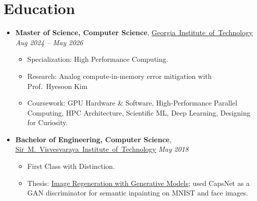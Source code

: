 \documentclass[letterpaper, 11pt]{article}
\let\oldhref\href
\renewcommand{\href}[2]{\oldhref{#1}{\uline{#2}}}
\newcommand{\resumeEntry}[3]{\item{\textbf{#1}, #2 \textbar{} \textit{#3}}}
\begin{document}
\section{Education}
\begin{itemize}[leftmargin=0pt, label={}]
  \resumeEntry{Master of Science, Computer Science}{\href{https://www.gatech.edu/}{\mbox{Georgia Institute of Technology}}}{Aug 2024 -- May 2026}
  \begin{itemize}
    \item{Specialization: High Performance Computing.}
    \item{Research: Analog compute-in-memory error mitigation with Prof.\ Hyesoon Kim}
    \item{Coursework: GPU Hardware \& Software, High-Performance Parallel Computing, HPC Architecture, Scientific ML, Deep Learning, Designing for Curiosity.}
  \end{itemize}
  \resumeEntry{Bachelor of Engineering, Computer Science}{\href{https://www.sirmvit.edu/}{\mbox{Sir M. Visvesvaraya Institute of Technology}}}{May 2018}
  \begin{itemize}
    \item{First Class with Distinction.}
    \item{Thesis: \href{https://files.knhash.in/ImageRegenerationWithGenerativeModels.pdf}{Image Regeneration with Generative Models}; used CapsNet as a GAN discriminator for semantic inpainting on MNIST and face images.}
  \end{itemize}
\end{itemize}
\end{document}
